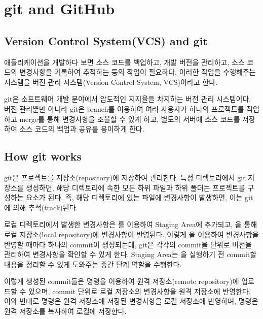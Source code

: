 \section{git and GitHub}\label{sect:git-and-github}

\subsection*{Version Control System(VCS) and git}

애플리케이션을 개발하다 보면 소스 코드를 백업하고, 개발 버전을 관리하고, 소스 코드의 변경사항을 기록하여 추적하는 등의 작업이 필요하다. 이러한 작업을 수행해주는 시스템을 버전 관리 시스템(Version Control System, VCS)이라고 한다.

git은 소프트웨어 개발 분야에서 압도적인 지지율을 차지하는 버전 관리 시스템이다. 버전 관리뿐만 아니라 git은 branch를 이용하여 여러 사용자가 하나의 프로젝트를 작업하고 merge를 통해 변경사항을 조율할 수 있게 하고, 별도의 서버에 소스 코드를 저장하여 소스 코드의 백업과 공유를 용이하게 한다.

\subsection*{How git works}

git은 프로젝트를 저장소(repository)에 저장하여 관리한다. 특정 디렉토리에서 git 저장소를 생성하면, 해당 디렉토리에 속한 모든 하위 파일과 하위 폴더는 프로젝트를 구성하는 요소가 된다. 즉, 해당 디렉토리에 있는 파일에 변경사항이 발생하면, 이는 git에 의해 추적(track)된다.

로컬 디렉토리에서 발생한 변경사항은 를 이용하여 Staging Area에 추가되고, 을 통해 로컬 저장소(local repository)에 변경사항이 반영된다. 이렇게 을 이용하여 변경사항을 반영할 때마다 하나의 commit이 생성되는데, git은 각각의 commit을 단위로 버전을 관리하여 변경사항을 확인할 수 있게 한다. Staging Area는 을 실행하기 전 commit할 내용을 정리할 수 있게 도와주는 중간 단계 역할을 수행한다.

이렇게 생성된 commit들은  명령을 이용하여 원격 저장소(remote repository)에 업로드할 수 있으며, commit 단위로 로컬 저장소의 변경사항을 원격 저장소에 반영한다. 이와 반대로  명령은 원격 저장소에 저장된 변경사항을 로컬 저장소에 반영하며,  명령은 원격 저장소를 복사하여 로컬에 저장한다.


